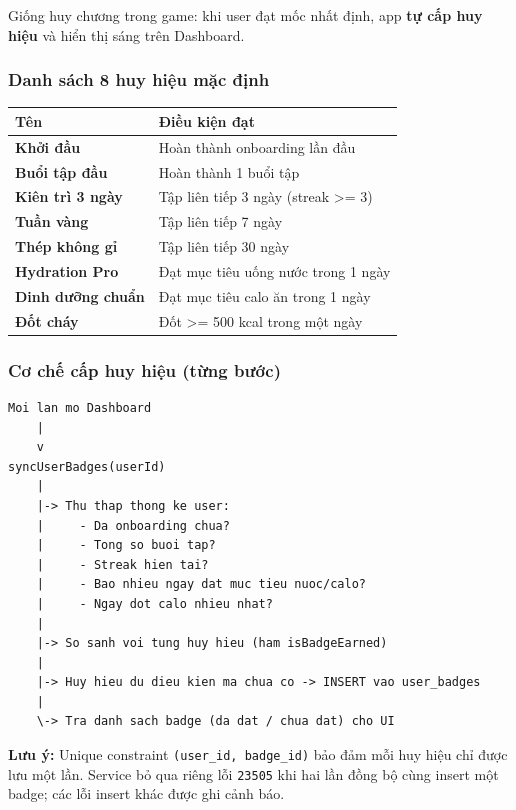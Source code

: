 \documentclass[12pt,a4paper]{article}
\newcounter{none}
\begin{document}
Giống huy chương trong game: khi user đạt mốc nhất định, app \textbf{tự
cấp huy hiệu} và hiển thị sáng trên Dashboard.

\subsubsection{Danh sách 8 huy hiệu mặc
định}\label{danh-suxe1ch-8-huy-hiux1ec7u-mux1eb7c-ux111ux1ecbnh}

{\def\LTcaptype{none} %
\begin{longtable}[]{@{}ll@{}}
\toprule\noalign{}
Tên & Điều kiện đạt \\
\midrule\noalign{}
\endhead
\bottomrule\noalign{}
\endlastfoot
\textbf{Khởi đầu} & Hoàn thành onboarding lần đầu \\
\textbf{Buổi tập đầu} & Hoàn thành 1 buổi tập \\
\textbf{Kiên trì 3 ngày} & Tập liên tiếp 3 ngày (streak \textgreater=
3) \\
\textbf{Tuần vàng} & Tập liên tiếp 7 ngày \\
\textbf{Thép không gỉ} & Tập liên tiếp 30 ngày \\
\textbf{Hydration Pro} & Đạt mục tiêu uống nước trong 1 ngày \\
\textbf{Dinh dưỡng chuẩn} & Đạt mục tiêu calo ăn trong 1 ngày \\
\textbf{Đốt cháy} & Đốt \textgreater= 500 kcal trong một ngày \\
\end{longtable}
}

\subsubsection{Cơ chế cấp huy hiệu (từng
bước)}\label{cux1a1-chux1ebf-cux1ea5p-huy-hiux1ec7u-tux1eebng-bux1b0ux1edbc}

\begin{verbatim}
Moi lan mo Dashboard
    |
    v
syncUserBadges(userId)
    |
    |-> Thu thap thong ke user:
    |     - Da onboarding chua?
    |     - Tong so buoi tap?
    |     - Streak hien tai?
    |     - Bao nhieu ngay dat muc tieu nuoc/calo?
    |     - Ngay dot calo nhieu nhat?
    |
    |-> So sanh voi tung huy hieu (ham isBadgeEarned)
    |
    |-> Huy hieu du dieu kien ma chua co -> INSERT vao user_badges
    |
    \-> Tra danh sach badge (da dat / chua dat) cho UI
\end{verbatim}

\textbf{Lưu ý:} Unique constraint \texttt{(user\_id,\ badge\_id)} bảo
đảm mỗi huy hiệu chỉ được lưu một lần. Service bỏ qua riêng lỗi
\texttt{23505} khi hai lần đồng bộ cùng insert một badge; các lỗi insert
khác được ghi cảnh báo.
\end{document}
